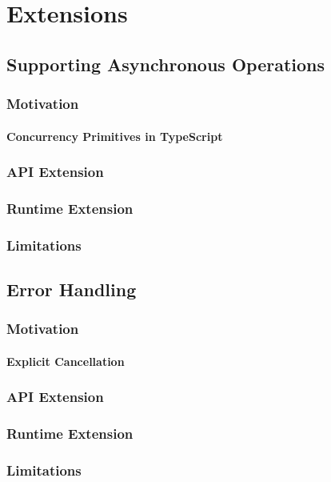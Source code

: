 \chapter{Extensions}
\label{chap:ext}

\section{Supporting Asynchronous Operations}

\subsection{Motivation}

\subsubsection{Concurrency Primitives in TypeScript}

\subsection{API Extension}

\subsection{Runtime Extension}

\subsection{Limitations}

\section{Error Handling}

\subsection{Motivation}

\subsubsection{Explicit Cancellation}

\subsection{API Extension}

\subsection{Runtime Extension}

\subsection{Limitations}
